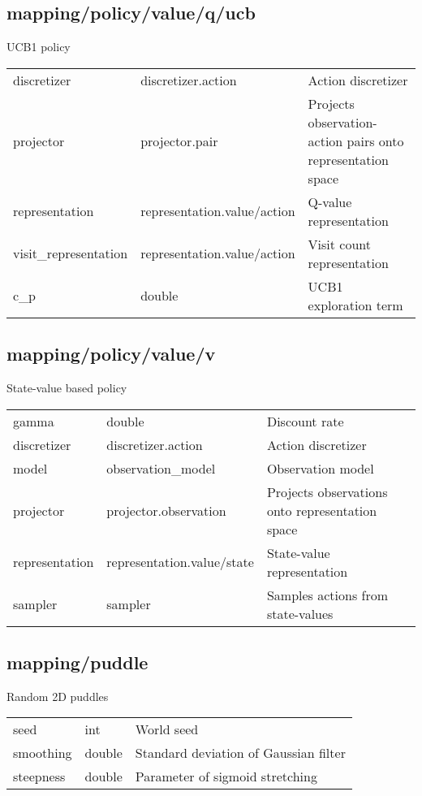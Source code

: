 \subsection{mapping/policy/value/q/ucb}
\noindent UCB1 policy\\

\noindent\begin{tabular}{@{}lll@{}}
discretizer&discretizer.action&Action discretizer\\
projector&projector.pair&Projects observation-action pairs onto representation space\\
representation&representation.value/action&Q-value representation\\
visit\_representation&representation.value/action&Visit count representation\\
c\_p&double&UCB1 exploration term\\
\end{tabular}
\subsection{mapping/policy/value/v}
\noindent State-value based policy\\

\noindent\begin{tabular}{@{}lll@{}}
gamma&double&Discount rate\\
discretizer&discretizer.action&Action discretizer\\
model&observation\_model&Observation model\\
projector&projector.observation&Projects observations onto representation space\\
representation&representation.value/state&State-value representation\\
sampler&sampler&Samples actions from state-values\\
\end{tabular}
\subsection{mapping/puddle}
\noindent Random 2D puddles\\

\noindent\begin{tabular}{@{}lll@{}}
seed&int&World seed\\
smoothing&double&Standard deviation of Gaussian filter\\
steepness&double&Parameter of sigmoid stretching\\
\end{tabular}
